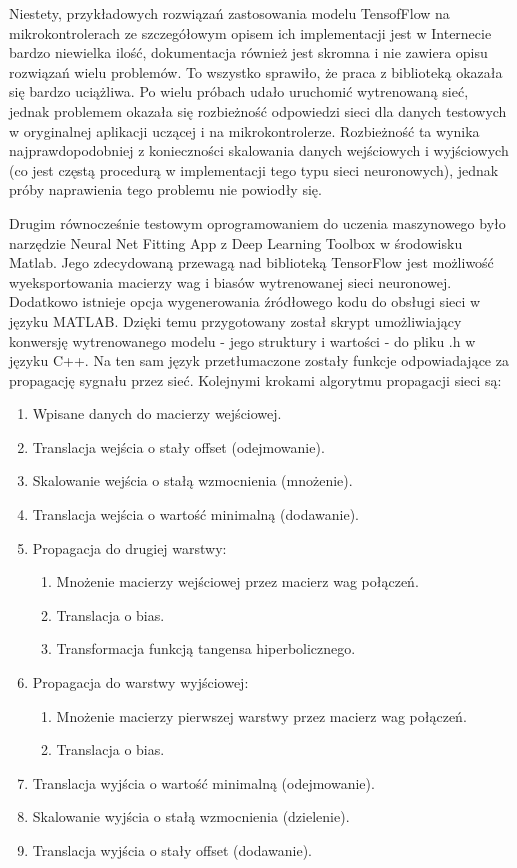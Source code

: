 \documentclass[12pt, a4paper]{article}
\begin{document}
Niestety, przykładowych rozwiązań zastosowania modelu TensofFlow na mikrokontrolerach ze szczegółowym opisem ich implementacji jest w Internecie bardzo niewielka ilość, dokumentacja również jest skromna i nie zawiera opisu rozwiązań wielu problemów. To wszystko sprawiło, że praca z biblioteką okazała się bardzo uciążliwa. Po wielu próbach udało uruchomić wytrenowaną sieć, jednak problemem okazała się rozbieżność odpowiedzi sieci dla danych testowych w oryginalnej aplikacji uczącej i na mikrokontrolerze. Rozbieżność ta wynika najprawdopodobniej z konieczności skalowania danych wejściowych i wyjściowych (co jest częstą procedurą w implementacji tego typu sieci neuronowych), jednak próby naprawienia tego problemu nie powiodły się. 

Drugim równocześnie testowym oprogramowaniem do uczenia maszynowego było narzędzie Neural Net Fitting App z Deep Learning Toolbox w środowisku Matlab. Jego zdecydowaną przewagą nad biblioteką TensorFlow jest możliwość wyeksportowania macierzy wag i biasów wytrenowanej sieci neuronowej. Dodatkowo istnieje opcja wygenerowania źródłowego kodu do obsługi sieci w języku MATLAB. Dzięki temu przygotowany został skrypt umożliwiający konwersję wytrenowanego modelu - jego struktury i wartości - do pliku .h w języku C++. Na ten sam język przetłumaczone zostały funkcje odpowiadające za propagację sygnału przez sieć. Kolejnymi krokami algorytmu propagacji sieci są:

\begin{enumerate}
    \item Wpisane danych do macierzy wejściowej.
	\item Translacja wejścia o stały offset (odejmowanie).
	\item Skalowanie wejścia o stałą wzmocnienia (mnożenie).
	\item Translacja wejścia o wartość minimalną (dodawanie).
	\item Propagacja do drugiej warstwy:
	\begin{enumerate}
		\item Mnożenie macierzy wejściowej przez macierz wag połączeń.
		\item Translacja o bias.
		\item Transformacja funkcją tangensa hiperbolicznego.
	\end{enumerate}
	\item Propagacja do warstwy wyjściowej:
	\begin{enumerate}
		\item Mnożenie macierzy pierwszej warstwy przez macierz wag połączeń.
		\item Translacja o bias.
	\end{enumerate}
	\item Translacja wyjścia o wartość minimalną (odejmowanie).
	\item Skalowanie wyjścia o stałą wzmocnienia (dzielenie).
	\item Translacja wyjścia o stały offset (dodawanie).
\end{enumerate}
\end{document}
